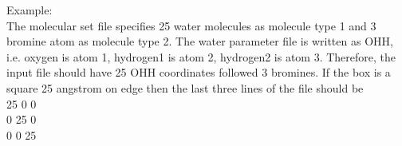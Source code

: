 Example: \\ 
The molecular set file specifies 25 water molecules as molecule
type 1 and 3 bromine atom as molecule type 2. The water parameter file is 
written as OHH, i.e. oxygen is atom 1, hydrogen1 is atom 2, hydrogen2 is 
atom 3. Therefore, the input file should have 25 OHH coordinates followed
3 bromines. If the box is a square 25 angstrom on edge 
then the last three lines of the file should be \\
\hspace*{1.5in}  25  0  0  \\
\hspace*{1.5in}  0  25  0  \\
\hspace*{1.5in}  0  0   25 \\





